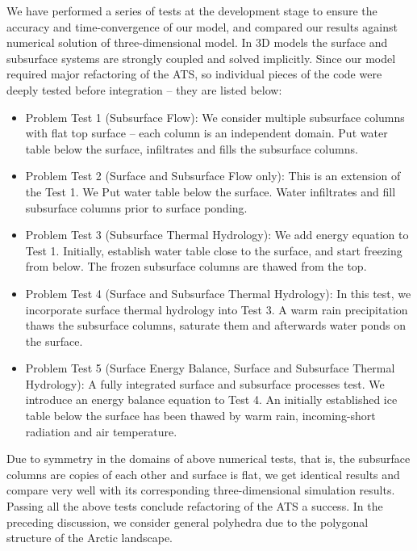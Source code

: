 \documentclass[review]{elsarticle}
\begin{document}
We have performed a series of tests at the development stage to ensure the accuracy and time-convergence of our model, and compared our results against numerical solution of three-dimensional model. In 3D models the surface and subsurface systems are strongly coupled and solved implicitly. Since our model required major refactoring of the ATS, so individual pieces of the code were deeply tested before integration -- they are listed below:
\begin{itemize}
\item{ Problem Test 1 (Subsurface Flow): 
We consider multiple subsurface columns with flat top surface -- each column is an independent domain. Put water table below the surface, infiltrates and fills the subsurface columns.
}
\item{ Problem Test 2 (Surface and Subsurface Flow only): 
This is an extension of the Test 1. We Put water table below the surface. Water infiltrates and fill subsurface columns prior to surface ponding. 
}

\item{ Problem Test 3 (Subsurface Thermal Hydrology): 
We add energy equation to Test 1. Initially, establish water table close to the surface, and start freezing from below. The frozen subsurface columns are thawed from the top.}

\item{ Problem Test 4 (Surface and Subsurface Thermal Hydrology):
In this test, we incorporate surface thermal hydrology into Test 3. A warm rain precipitation thaws the subsurface columns, saturate them and afterwards water ponds on the surface.}

\item{ Problem Test 5 (Surface Energy Balance, Surface and Subsurface Thermal Hydrology):
A fully integrated surface and subsurface processes test. We introduce an energy balance equation to Test 4. An initially established ice table below the surface has been thawed by warm rain, incoming-short radiation and air temperature.}

\end{itemize}
Due to symmetry in the domains of above numerical tests, that is, the subsurface columns are copies of each other and surface is flat, we get identical results and compare very well with its corresponding three-dimensional simulation results. Passing all the above tests conclude refactoring of the ATS a success. In the preceding discussion, we consider general polyhedra due to the polygonal structure of the Arctic landscape.
\end{document}
